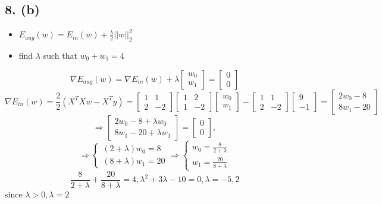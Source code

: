 \documentclass[12pt,a4paper]{article}
\begin{document}
\subsection{8. (b)}
\begin{itemize}
\item $E_{aug}(w) = E_{in}(w) + \frac{\lambda}{2}||w||_2^2$


\item find $\lambda$ such that $w_0 + w_1 = 4$

\end{itemize}
\[
\nabla E_{aug}(w) = 
    \nabla E_{in}(w) +
    \lambda
    \begin{bmatrix}
        w_0 \\
        w_1
    \end{bmatrix} = 
    \begin{bmatrix}
        0 \\
        0
    \end{bmatrix}
\]
\[
\nabla E_{in}(w) = 
    \frac{2}{2}(X^TXw-X^Ty) = 
    \begin{bmatrix}
        1 & 1  \\
        2 & -2
    \end{bmatrix}
    \begin{bmatrix}
        1 & 2  \\
        1 & -2
    \end{bmatrix}
    \begin{bmatrix}
        w_0 \\
        w_1
    \end{bmatrix} -
    \begin{bmatrix}
        1 & 1  \\
        2 & -2
    \end{bmatrix}
    \begin{bmatrix}
        9 \\
        -1
    \end{bmatrix} = 
    \begin{bmatrix}
        2w_0 - 8 \\
        8w_1 - 20
    \end{bmatrix}
\]
\[
\Rightarrow 
\begin{bmatrix}
    2w_0-8+\lambda w_0 \\
    8w_1-20+\lambda w_1
\end{bmatrix} = 
\begin{bmatrix}
    0 \\
    0
\end{bmatrix},
\]
\[
\Rightarrow
\begin{cases}
    (2+\lambda)w_0 = 8 \\
    (8+\lambda)w_1 = 20
\end{cases}
\Rightarrow
\begin{cases}
    w_0 = \frac{8}{2+\lambda} \\
    w_1 = \frac{20}{8+\lambda}
\end{cases}
\]
\[
\frac{8}{2+\lambda} + \frac{20}{8+\lambda} = 4, \lambda^2+3\lambda-10=0, \lambda=-5, 2
\]
since $\lambda > 0, \lambda = 2$
\end{document}
